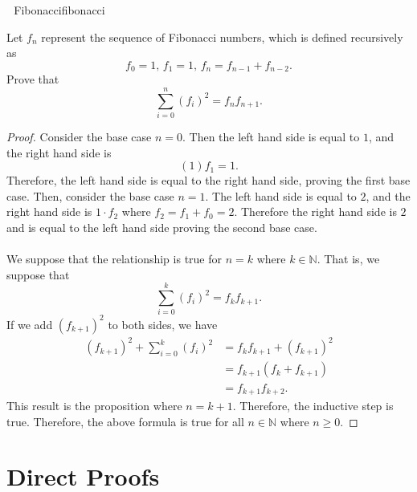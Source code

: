     \begin{exercise}{\Difficulty\,\Difficulty\,\Difficulty\,\,Fibonacci}{fibonacci}
    
        Let \(f_n\) represent the sequence of Fibonacci numbers, which is defined recursively as
        \begin{equation*}
            f_0=1,\,f_1=1,\,f_n=f_{n-1}+f_{n-2}.
        \end{equation*}
        Prove that
        \begin{equation*}
            \sum_{i=0}^n(f_i)^2=f_nf_{n+1}.
        \end{equation*}
        \begin{proof}
            Consider the base case \(n=0\). Then the left hand side is equal to \(1\), and the right hand side is
            \begin{equation*}
                (1)f_1=1.
            \end{equation*}
            Therefore, the left hand side is equal to the right hand side, proving the first base case. Then, consider the base case \(n=1\). The left hand side is equal to \(2\), and the right hand side is \(1\cdot f_2\) where \(f_2=f_1+f_0=2\). Therefore the right hand side is \(2\) and is equal to the left hand side proving the second base case.
            \\
            \\
            We suppose that the relationship is true for \(n=k\) where \(k\in\mathbb{N}\). That is, we suppose that
            \begin{equation*}
                \sum_{i=0}^k(f_i)^2=f_kf_{k+1}.
            \end{equation*}
            If we add \((f_{k+1})^2\) to both sides, we have
            \begin{align*}
                (f_{k+1})^2+\sum_{i=0}^k(f_i)^2&=f_kf_{k+1}+(f_{k+1})^2 \\
                &=f_{k+1}(f_k+f_{k+1}) \\
                &=f_{k+1}f_{k+2}.
            \end{align*}
            This result is the proposition where \(n=k+1\). Therefore, the inductive step is true. Therefore, the above formula is true for all \(n\in\mathbb{N}\) where \(n \geq 0\).
        \end{proof}
    \end{exercise}
    
\pagebreak    
\section{Direct Proofs}

